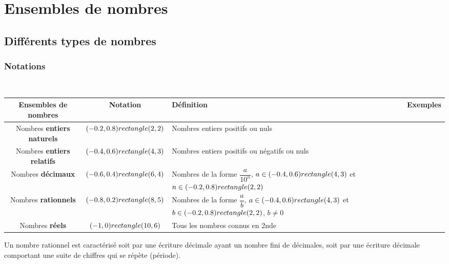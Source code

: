 



\chapter{Ensembles de nombres}

\section{Différents types de nombres}

\subsection{Notations}

\begin{Définition} $ $ \\
\begin{center}
\renewcommand{\arraystretch}{2}
\begin{tabular}{|c|c|C{3.5cm}|c|}
\hline 
\textbf{Ensembles de nombres} & \textbf{Notation} & \textbf{Définition} & \textbf{Exemples} \\
\hline 
Nombres \textbf{entiers naturels} & $(-0.2,0.8) rectangle (2,2)$ &  Nombres entiers positifs ou nuls  &
 \\ 
\hline 
Nombres \textbf{entiers relatifs} & $(-0.4,0.6) rectangle (4,3)$ &  Nombres entiers positifs ou négatifs ou nuls  &  \\ 
\hline 
Nombres \textbf{décimaux} & $(-0.6,0.4) rectangle (6,4)$ &  Nombres de la forme $\dfrac{a}{10^n}$, $a \in (-0.4,0.6) rectangle (4,3)$ et $n \in (-0.2,0.8) rectangle (2,2)$  &   \\ 
\hline 
Nombres \textbf{rationnels} & $(-0.8,0.2) rectangle (8,5)$ & Nombres de la forme $\dfrac{a}{b}$, $a \in (-0.4,0.6) rectangle (4,3)$ et $b \in (-0.2,0.8) rectangle (2,2)$, $b \neq 0$ &  \\ 
\hline 
Nombres \textbf{réels} & $(-1,0) rectangle (10,6)$ & Tous les nombres connus en 2nde  &  \\ 
\hline 
\end{tabular} 
\end{center}
\end{Définition}

\begin{Propriété}
Un nombre rationnel est caractérisé soit par une écriture décimale ayant un nombre fini de décimales, soit par une écriture décimale comportant une suite de chiffres qui se répète (période).
\end{Propriété}

